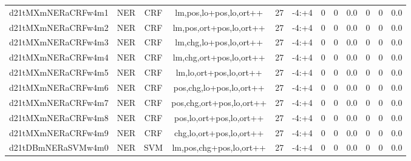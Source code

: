\documentclass[a4paper]{article}
\begin{document}
\begin{landscape}
\begin{center}
\begin{tabular}{ |c|c|c|c|c|c|c|c|c|c|c|c|}
 
 	
 	\small{ d21tMXmNERaCRFw4m1 } & \small{ NER} & \small{  CRF }  & lm,pos,lo+pos,lo,ort++  &  27 &  \small{  -4:+4 }  &  0 & 0 & 0.0  &  0 & 0 & 0.0 \\
 	

 
 	
 	\small{ d21tMXmNERaCRFw4m2 } & \small{ NER} & \small{  CRF }  & lm,pos,ort+pos,lo,ort++  &  27 &  \small{  -4:+4 }  &  0 & 0 & 0.0  &  0 & 0 & 0.0 \\
 	

 
 	
 	\small{ d21tMXmNERaCRFw4m3 } & \small{ NER} & \small{  CRF }  & lm,chg,lo+pos,lo,ort++  &  27 &  \small{  -4:+4 }  &  0 & 0 & 0.0  &  0 & 0 & 0.0 \\
 	

 
 	
 	\small{ d21tMXmNERaCRFw4m4 } & \small{ NER} & \small{  CRF }  & lm,chg,ort+pos,lo,ort++  &  27 &  \small{  -4:+4 }  &  0 & 0 & 0.0  &  0 & 0 & 0.0 \\
 	

 
 	
 	\small{ d21tMXmNERaCRFw4m5 } & \small{ NER} & \small{  CRF }  & lm,lo,ort+pos,lo,ort++  &  27 &  \small{  -4:+4 }  &  0 & 0 & 0.0  &  0 & 0 & 0.0 \\
 	

 
 	
 	\small{ d21tMXmNERaCRFw4m6 } & \small{ NER} & \small{  CRF }  & pos,chg,lo+pos,lo,ort++  &  27 &  \small{  -4:+4 }  &  0 & 0 & 0.0  &  0 & 0 & 0.0 \\
 	

 
 	
 	\small{ d21tMXmNERaCRFw4m7 } & \small{ NER} & \small{  CRF }  & pos,chg,ort+pos,lo,ort++  &  27 &  \small{  -4:+4 }  &  0 & 0 & 0.0  &  0 & 0 & 0.0 \\
 	

 
 	
 	\small{ d21tMXmNERaCRFw4m8 } & \small{ NER} & \small{  CRF }  & pos,lo,ort+pos,lo,ort++  &  27 &  \small{  -4:+4 }  &  0 & 0 & 0.0  &  0 & 0 & 0.0 \\
 	

 
 	
 	\small{ d21tMXmNERaCRFw4m9 } & \small{ NER} & \small{  CRF }  & chg,lo,ort+pos,lo,ort++  &  27 &  \small{  -4:+4 }  &  0 & 0 & 0.0  &  0 & 0 & 0.0 \\
 	

 
 	
 	\small{ d21tDBmNERaSVMw4m0 } & \small{ NER} & \small{  SVM }  & lm,pos,chg+pos,lo,ort++  &  27 &  \small{  -4:+4 }  &  0 & 0 & 0.0  &  0 & 0 & 0.0 \\
 	


\end{tabular}
\end{center}
\end{landscape}
\end{document}
